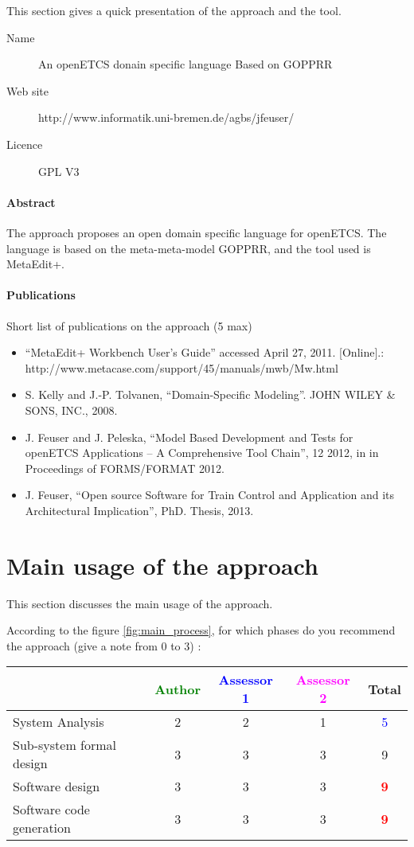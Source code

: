 This section gives a quick presentation of the approach and the tool.

\begin{description}
\item[Name] An openETCS donain specific language Based on GOPPRR
\item[Web site] http://www.informatik.uni-bremen.de/agbs/jfeuser/
\item[Licence] GPL V3
\end{description}

\paragraph{Abstract} 
The approach proposes an open  domain specific language for
openETCS. The language is based on the meta-meta-model  GOPPRR, and the
tool used is MetaEdit+.


\paragraph{Publications} Short list of publications on the approach (5 max)
\begin{itemize}
\item ``MetaEdit+ Workbench User’s Guide'' accessed April 27, 2011. [Online].:
http://www.metacase.com/support/45/manuals/mwb/Mw.html
\item S. Kelly and J.-P. Tolvanen, ``Domain-Specific Modeling''. JOHN WILEY \& SONS, INC.,
2008.
\item J. Feuser and J. Peleska, ``Model Based Development and Tests for openETCS Applications
– A Comprehensive Tool Chain'', 12 2012, in in Proceedings of FORMS/FORMAT 2012.
\item J. Feuser, ``Open source Software for Train Control and
  Application and its Architectural Implication'', PhD. Thesis, 2013.
\end{itemize}


\section{Main usage of the approach}
\label{main_usage}
This section discusses the main usage of the approach.

According to the figure \ref{fig:main_process}, for which phases do you recommend the approach (give a note from 0 to  3) :

\begin{tabular}{|l | c | c | c | c|}
\hline
& \textcolor{green}{Author} & \textcolor{blue}{Assessor 1} & \textcolor{magenta}{Assessor 2} & Total \\
\hline 
System Analysis &
2 &2 & 1   & \textcolor{blue}{5} \\
\hline
Sub-system formal design &3 &3 & 3   &  9 \\
\hline
Software design &3 &3 & 3   & \textcolor{red}{\textbf{9}} \\
\hline
Software code generation &3 &3 & 3   & \textcolor{red}{\textbf{9}} \\
\hline
\end{tabular}

